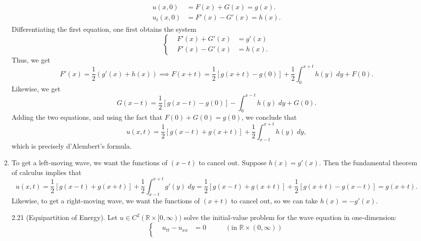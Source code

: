 \documentclass{article}
\begin{document}
\begin{enumerate}[itemsep =-2pt,label = (\alph{*})]
	\begin{align*}
		\begin{split}
			u(x, 0) &= F(x) + G(x) = g(x). \\
			u_{t}(x, 0) &= F'(x) - G'(x) = h(x). 
		\end{split}
	\end{align*}
	Differentiating the first equation, one first obtains the system 
	\begin{equation*}
		\left\{
		\begin{alignedat}{2}
			&F'(x) + G'(x) &= g'(x) \\
			&F'(x) - G'(x) &= h(x). 
		\end{alignedat}
		\right. 
	\end{equation*} 
	Thus, we get 
	\begin{equation*}
		F'(x) = \frac{1}{2}(g'(x) +h(x)) \implies F(x + t) = \frac{1}{2}[g(x+ t) - g(0)] + \frac{1}{2}\int_{0}^{x + t}h(y)\;dy + F(0). 
	\end{equation*}
	Likewise, we get 
	\begin{equation*}
		G(x-t) = \frac{1}{2}[g(x - t) - g(0)] -\int_{0}^{x - t}h(y)\;dy + G(0). 
	\end{equation*}
	Adding the two equations, and using the fact that $F(0) + G(0) = g(0)$, we conclude that 
	\begin{equation*}
		u(x,t) = \frac{1}{2}[g(x - t) + g(x + t)] + \frac{1}{2}\int_{x - t}^{x + t}h(y)\;dy, 
	\end{equation*}
	which is precisely d'Alembert's formula. 
	\item To get a left-moving wave, we want the functions of $(x - t)$ to cancel out. Suppose $h(x) = g'(x)$. Then the fundamental theorem of calculus implies that 
	\begin{equation*}
		u(x, t) = \frac{1}{2}[g(x - t) + g(x + t)] + \frac{1}{2}\int_{x - t}^{x + t}g'(y)\;dy = \frac{1}{2}[g(x - t) + g(x + t)] +\frac{1}{2}[g(x + t) - g(x - t)] = g(x + t). 
	\end{equation*}
	Likewise, to get a right-moving wave, we want the functions of $(x + t)$ to cancel out, so we can take $h(x) = -g'(x)$. 
	\begin{prb}{2.21}
		(Equipartition of Energy). Let $u \in C^{2}(\mathbb{R} \times [0,\infty))$ solve the initial-value problem for the wave equation in one-dimension: 
		\begin{equation*}
			\left\{
			\begin{alignedat}{3}
				&u_{tt} - u_{xx} &=0 \qquad &(\text{in } \mathbb{R} \times (0,\infty)) \\

\end{alignedat}
\end{equation*}
\end{prb}
\end{enumerate}
\end{document}
